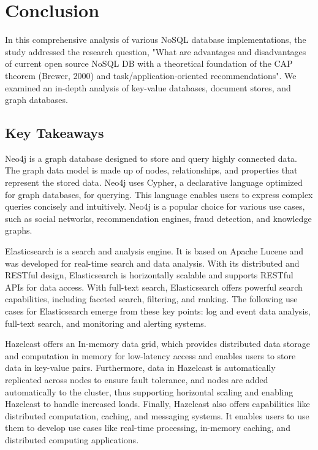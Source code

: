 
\chapter{Conclusion} \label{ch:conclusion}

In this comprehensive analysis of various \ac{NoSQL} database implementations, the study addressed the research question, "What are advantages and disadvantages of current open source \ac{NoSQL} DB with a theoretical foundation of the \ac{CAP} theorem (Brewer, 2000) and task/application-oriented recommendations". We examined an in-depth analysis of key-value databases, document stores, and graph databases.
\section*{Key Takeaways}
Neo4j is a graph database designed to store and query highly connected data. The graph data model is made up of nodes, relationships, and properties that represent the stored data. Neo4j uses Cypher, a declarative language optimized for graph databases, for querying. This language enables users to express complex queries concisely and intuitively. Neo4j is a popular choice for various use cases, such as social networks, recommendation engines, fraud detection, and knowledge graphs.

Elasticsearch is a search and analysis engine. It is based on Apache Lucene and was developed for real-time search and data analysis. With its distributed and RESTful design, Elasticsearch is horizontally scalable and supports RESTful APIs for data access. With full-text search, Elasticsearch offers powerful search capabilities, including faceted search, filtering, and ranking. The following use cases for Elasticsearch emerge from these key points: log and event data analysis, full-text search, and monitoring and alerting systems.

Hazelcast offers an In-memory data grid, which provides distributed data storage and computation in memory for low-latency access and enables users to store data in key-value pairs. Furthermore, data in Hazelcast is automatically replicated across nodes to ensure fault tolerance, and nodes are added automatically to the cluster, thus supporting horizontal scaling and enabling Hazelcast to handle increased loads. Finally, Hazelcast also offers capabilities like distributed computation, caching, and messaging systems. It enables users to use them to develop use cases like real-time processing, in-memory caching, and distributed computing applications. 

